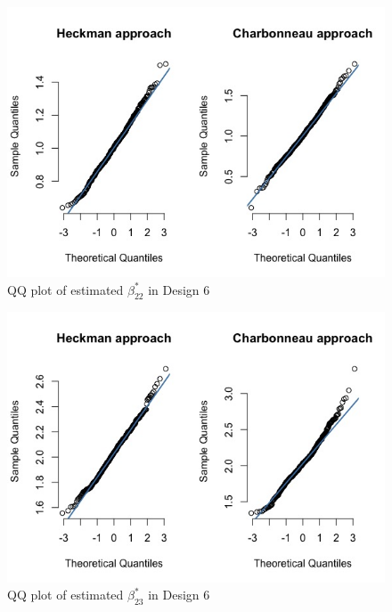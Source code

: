 \begin{figure}[htbp]
    \vspace{-2.5em}%
    \begin{adjustwidth}{-.5in}{-.5in}
\centerline{\includegraphics[scale=.4]{content/Figures/QQ_beta_22_Design6.png}}
\caption{\footnotesize{QQ plot of estimated $\beta_{22}^*$ in Design 6}}
\label{QQ_beta_22_Design6}
\end{adjustwidth}
\end{figure}
\begin{figure}[htbp]
    \vspace{-2.5em}%
    \begin{adjustwidth}{-.5in}{-.5in}
\centerline{\includegraphics[scale=.4]{content/Figures/QQ_beta_23_Design6.png}}
\caption{\footnotesize{QQ plot of estimated $\beta_{23}^*$ in Design 6}}
\label{QQ_beta_23_Design6}
\end{adjustwidth}
\end{figure}
